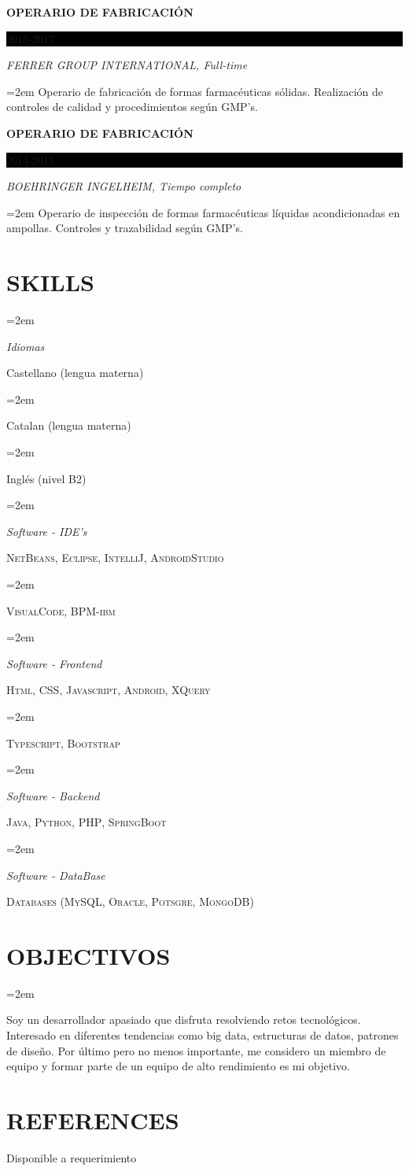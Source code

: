 \documentclass[paper=a4,fontsize=11pt]{scrartcl} %
\newlength{\spacebox}
\newcommand{\sepspace}{\vspace*{1em}}		%
\newcommand{\NewPart}[1]{\section*{\uppercase{#1}}}
\newcommand{\PersonalEntry}[2]{
		\noindent\hangindent=2em\hangafter=0 %
		\parbox{\spacebox}{        %
		\textit{#1}}		       %
		\hspace{1.5em} #2 \par}    %
\newcommand{\ObjectivesEntry}[2]{      %
		\noindent\hangindent=2em\hangafter=0 %
		\parbox{\spacebox}{        %
		\textit{#1}}			   %
		\hspace{1.5em} #2 \par}    %
\newcommand{\SkillsEntry}[2]{      %
		\noindent\hangindent=2em\hangafter=0 %
		\parbox{\spacebox}{        %
		\textit{#1}}			   %
		\hspace{1.5em} #2 \par}    %
\newcommand{\EducationEntry}[4]{
		\noindent \textbf{#1} \hfill      %
		\colorbox{Black}{%
			\parbox{6em}{%
			\hfill\color{White}#2}} \par  %
		\noindent \textit{#3} \par        %
		\noindent\hangindent=2em\hangafter=0 \small #4 %
		\normalsize \par}
\begin{document}
\EducationEntry{OPERARIO DE FABRICACIÓN}{2015-2017}{FERRER GROUP INTERNATIONAL, Full-time}{Operario de fabricación de formas farmacéuticas sólidas. Realización de controles de calidad y procedimientos según GMP’s.}
\sepspace

\EducationEntry{OPERARIO DE FABRICACIÓN}{2014-2015}{BOEHRINGER INGELHEIM, Tiempo completo}{Operario de inspección de formas farmacéuticas líquidas acondicionadas en ampollas. Controles y trazabilidad según GMP’s.}
\sepspace

\NewPart{Skills}{}

\SkillsEntry{Idiomas}{Castellano (lengua materna)}
\SkillsEntry{}{Catalan (lengua materna)}
\SkillsEntry{}{Inglés (nivel B2)}


\SkillsEntry{Software - IDE's}{\textsc{NetBeans}, \textsc{Eclipse}, \textsc{IntelliJ}, \textsc{AndroidStudio}}
\SkillsEntry{}{\textsc{VisualCode}, \textsc{BPM-ibm}}
\sepspace

\SkillsEntry{Software - Frontend}{\textsc{Html}, \textsc{CSS}, \textsc{Javascript}, \textsc{Android}, \textsc{XQuery}}
\SkillsEntry{}{\textsc{Typescript}, \textsc{Bootstrap}}
\sepspace

\SkillsEntry{Software - Backend}{\textsc{Java}, \textsc{Python}, \textsc{PHP}, \textsc{SpringBoot}}
\sepspace

\SkillsEntry{Software - DataBase}{\textsc{Databases (MySQL, Oracle, Potsgre, MongoDB)}}
\sepspace

\NewPart{Objectivos}{}

\ObjectivesEntry{}
{Soy un desarrollador apasiado que disfruta resolviendo retos tecnológicos. Interesado en diferentes tendencias como big data, estructuras de datos, patrones de diseño. Por último pero no menos importante, me considero un miembro de equipo y formar parte de un equipo de alto rendimiento es mi objetivo.}



\NewPart{References}{}
Disponible a requerimiento
\end{document}

